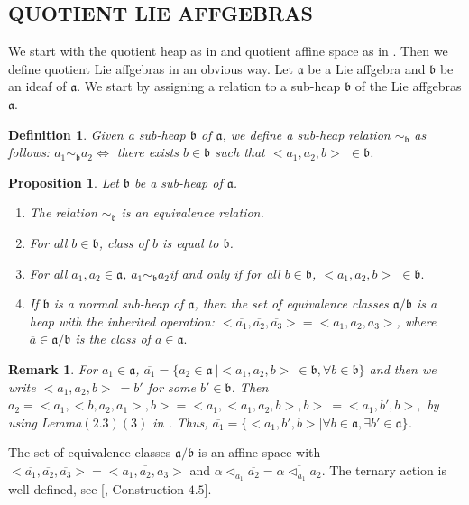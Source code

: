 \documentclass{article}
\newtheorem{remark}{Remark}[section]
\newtheorem{definition}{Definition}[section]
\newtheorem{proposition}[theorem]{Proposition}
\theoremstyle{definition}
\theoremstyle{remark}
\theoremstyle{plain}
\begin{document}
\subsection{QUOTIENT LIE AFFGEBRAS}
We start with the quotient heap as in \cite{Brz22} and quotient affine space as in \cite{Brz22}. Then we define quotient Lie affgebras in an obvious way.
Let $\mathfrak{a}$ be a Lie affgebra and $\mathfrak{b}$ be an ideaf of $\mathfrak{a}$. We start by assigning a relation to a sub-heap $\mathfrak{b}$ of the Lie affgebras $\mathfrak{a}$.
\begin{definition}\cite{Brz22}
    Given a sub-heap $\mathfrak{b}$ of $\mathfrak{a}$, we define a sub-heap relation $\sim_{\mathfrak{b}}$ as follows: $a_1\sim_{\mathfrak{b}} a_2 \iff$ there exists $b\in \mathfrak{b}$ such that $<a_1, a_2, b>$ $ \in \mathfrak{b}$.
\end{definition}
\begin{proposition}\cite{Brz22}
    Let $\mathfrak{b}$ be a sub-heap of $\mathfrak{a}$.
    \begin{enumerate}
        \item The relation $\sim_{\mathfrak{b}}$ is an equivalence relation.
        \item For all $b\in \mathfrak{b}$, class of $b$ is equal to $\mathfrak{b}$.
        \item For all $a_1, a_2 \in \mathfrak{a}$, $a_1 \sim_{\mathfrak{b}} a_2 $if and only if for all $b\in \mathfrak{b}$, $<a_1, a_2, b>$ $\in \mathfrak{b}.$
        \item If $\mathfrak{b}$ is a normal sub-heap of $\mathfrak{a}$, then the set of equivalence classes $\mathfrak{a}/\mathfrak{b}$ is a heap with the inherited operation: $<\overline{a_1}, \overline{a_2},\overline{a_3} >=\overline{<a_1, a_2, a_3>}$, where $\overline{a}\in \mathfrak{a}/\mathfrak{b}$ is the class of $a \in \mathfrak{a}.$ 
    \end{enumerate}
\end{proposition}


\begin{remark}
    For $a_1\in \mathfrak{a}$, $\overline{a_1}=\{a_2\in \mathfrak{a}~| <a_1, a_2, b>~\in \mathfrak{b},  \forall b\in \mathfrak{b} \}$ and then we write $<a_1, a_2, b>~=b'$ for some $b' \in \mathfrak{b}$. Then $a_2=<a_1, <b, a_2, a_1>, b>=<a_1,<a_1, a_2,b>, b>~=<a_1, b', b>,$ by using Lemma$(2.3)(3)$ in \cite{Brz22}. Thus, $\overline{a_1}=\{ <a_1, b', b>| \forall b\in \mathfrak{a}, \exists b'\in \mathfrak{a}\}$.
\end{remark}
The set of equivalence classes $\mathfrak{a}/\mathfrak{b}$ is an affine space with 
$<\overline{a_1}, \overline{a_2},\overline{a_3} >=\overline{<a_1, a_2, a_3>} $ and $\alpha\triangleleft_{\overline{a_1}}\overline{a_2}=\overline{\alpha\triangleleft_{a_1}a_2}$. The ternary action is well defined, see [\cite{Brz1}, Construction $4.5$].\\
\end{document}
